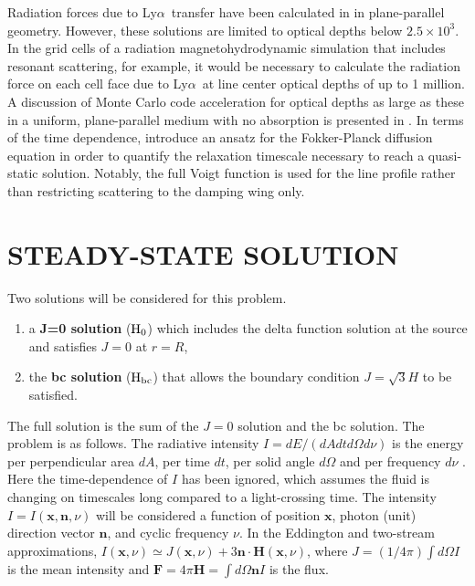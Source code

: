 \documentclass{aastex63}
\renewcommand{\vec}[1]{\mathbf{#1}}
\newcommand\lya{Ly$\alpha$\ }
\begin{document}
Radiation forces due to \lya transfer have been calculated in \citet{1976ApJ...208..286W} in plane-parallel geometry. However, these solutions are limited to optical depths below $2.5 \times 10^3$. In the grid cells of a radiation magnetohydrodynamic simulation that includes resonant scattering, for example, it would be necessary to calculate the radiation force on each cell face due to \lya at line center optical depths of up to 1 million. A discussion of Monte Carlo code acceleration for optical depths as large as these in a uniform, plane-parallel medium with no absorption is presented in  \citet{2002ApJ...567..922A,2015MNRAS.449.4336S}. In terms of the time dependence, \citet{1994ApJ...427..603R} introduce an ansatz for the Fokker-Planck diffusion equation in order to quantify the relaxation timescale necessary to reach a quasi-static solution. Notably, the full Voigt function is used for the line profile rather than restricting scattering to the damping wing only.


\section{STEADY-STATE SOLUTION}
\label{sec:steadystate}

Two solutions will be considered for this problem.

\begin{enumerate}
    \item a \textbf{J=0 solution} ($\rm H_0$) which includes the delta function solution at the source and satisfies $J=0$ at $r=R$,
    \item the \textbf{bc solution} ($\rm H_{bc}$) that allows the boundary condition $J=\sqrt{3}H$ to be satisfied.
\end{enumerate}

\noindent The full solution is the sum of the $J=0$ solution and the bc solution. The problem is as follows. The radiative intensity $I = dE/(dA dt d\Omega d\nu)$ is the energy per perpendicular area $dA$, per time $dt$, per solid angle $d\Omega$ and per frequency $d\nu$ \citep{1986rpa..book.....R}. Here the time-dependence of $I$ has been ignored, which assumes the fluid is changing on timescales long compared to a light-crossing time. The intensity $I=I(\vec{x},\vec{n}, \nu)$ will be considered a function of position $\vec{x}$, photon (unit) direction vector $\vec{n}$, and cyclic frequency $\nu$. In the Eddington and two-stream approximations, $I(\vec{x},\nu) \simeq J(\vec{x},\nu) + 3 \vec{n} \cdot \vec{H}(\vec{x},\nu)$, where $J=(1/4\pi) \int d\Omega I$ is the mean intensity and $\vec{F} = 4\pi \vec{H}= \int d\Omega \vec{n} I$ is the flux.  
\end{document}
